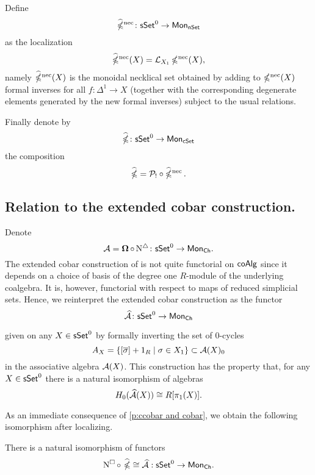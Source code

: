 Define 
$$\operatorname{\widehat{\mathbb{\Omega}}^{\mathrm{nec}}} \colon \mathsf{sSet}^0 \to \mathsf{Mon}_{\mathsf{nSet}}$$
as the localization
$$\operatorname{\widehat{\mathbb{\Omega}}^{\mathrm{nec}}}(X)= \mathcal{L}_{X_1} \operatorname{\mathbb{\Omega}^{\mathrm{nec}}}(X),$$
namely $\operatorname{\widehat{\mathbb{\Omega}}^{\mathrm{nec}}}(X)$ is the monoidal necklical set obtained by adding to $\operatorname{\mathbb{\Omega}^{\mathrm{nec}}}(X)$  formal inverses for all $f\colon \Delta^1 \to X$ (together with the corresponding degenerate elements generated by the new formal inverses) subject to the usual relations.

Finally denote by $$\widehat{\operatorname{\mathbb{\Omega}}} \colon \mathsf{sSet}^0 \to \mathsf{Mon}_{\mathsf{cSet}}$$ the composition $$\widehat{\operatorname{\mathbb{\Omega}}}= \mathcal{P}_{!} \circ \operatorname{\widehat{\mathbb{\Omega}}^{\mathrm{nec}}}.$$ 


\subsection{Relation to the extended cobar construction.}

Denote $$\operatorname{\mathcal{A}}= \operatorname{\mathbf{\Omega}} \circ \operatorname{N^{\triangle}} \colon \mathsf{sSet}^0 \to \mathsf{Mon}_{\mathsf{Ch}}.$$ The extended cobar construction of \cite{hess2010cobar} is not quite functorial on $\mathsf{coAlg}$ since it depends on a choice of basis of the degree one $R$-module of the underlying coalgebra.
It is, however, functorial with respect to maps of reduced simplicial sets.
Hence, we reinterpret the extended cobar construction as the functor
\begin{equation*}
\operatorname{\mathcal{\widehat{A}}} \colon \mathsf{sSet}^0 \to \mathsf{Mon}_{\mathsf{Ch}}
\end{equation*}


given on any $X \in \mathsf{sSet}^0$ by formally inverting the set of $0$-cycles
\begin{equation*}
A_X = \{ [\overline{\sigma}]+1_R \mid \sigma \in X_1 \} \subset \operatorname{\mathcal{A}}(X)_0
\end{equation*}
in the associative algebra $\operatorname{\mathcal{A}}(X)$.
This construction has the property that, for any $X \in \mathsf{sSet}^0$ there is a natural isomorphism of algebras
\begin{equation*}
H_0(\operatorname{\mathcal{\widehat{A}}}(X)) \cong R[\pi_1(X)].
\end{equation*}

As an immediate consequence of \cref{p:ccobar and cobar}, we obtain the following isomorphism after localizing.


\begin{corollary}
	There is a natural isomorphism of functors
	$$\operatorname{N^{\square}} \circ\ \widehat{\operatorname{\mathbb{\Omega}}} \cong \operatorname{\mathcal{\widehat{A}}} :\mathsf{sSet}^0 \to \mathsf{Mon}_{\mathsf{Ch}}.$$ 
\end{corollary}

